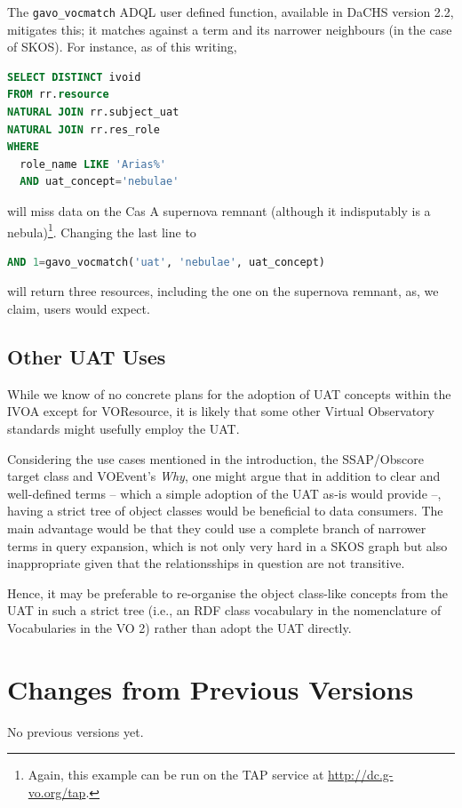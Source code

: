 \documentclass[11pt,a4paper]{ivoa}
\begin{document}
The \verb|gavo_vocmatch| ADQL user defined function, available in DaCHS
version 2.2, mitigates this; it matches against a term and its narrower
neighbours (in the case of SKOS).  For instance, as of this writing,
\begin{lstlisting}[language=SQL]
SELECT DISTINCT ivoid 
FROM rr.resource
NATURAL JOIN rr.subject_uat
NATURAL JOIN rr.res_role
WHERE
  role_name LIKE 'Arias%'
  AND uat_concept='nebulae'
\end{lstlisting}
will miss data on the Cas A supernova remnant (although it indisputably
is a nebula)\footnote{Again, this example can be run on the TAP service
at \url{http://dc.g-vo.org/tap}.}.  Changing the last line to

\begin{lstlisting}[language=SQL]
    AND 1=gavo_vocmatch('uat', 'nebulae', uat_concept)
\end{lstlisting}

will return three resources, including the one on the supernova remnant,
as, we claim, users would expect.

\subsection{Other UAT Uses}

While we know of no concrete plans for the adoption of UAT concepts
within the IVOA except for
VOResource, it is likely that some other Virtual Observatory
standards might usefully employ the UAT.  

Considering the use cases mentioned in the introduction, the
SSAP/Obscore target class and VOEvent's \emph{Why}, one might argue that
in addition to clear and well-defined terms -- which a simple adoption
of the UAT as-is would provide --, having a strict tree of object
classes would be beneficial to data consumers.  The main advantage would
be that they could use a complete branch of narrower terms in query
expansion, which is not only very hard in a SKOS graph but also
inappropriate given that the relationsships in question are not
transitive.

Hence, it may be preferable to re-organise the object class-like
concepts from the UAT in such a strict tree (i.e., an RDF class
vocabulary in the nomenclature of Vocabularies in the VO 2) rather than
adopt the UAT directly.

\appendix
\section{Changes from Previous Versions}

No previous versions yet.  


\end{document}

